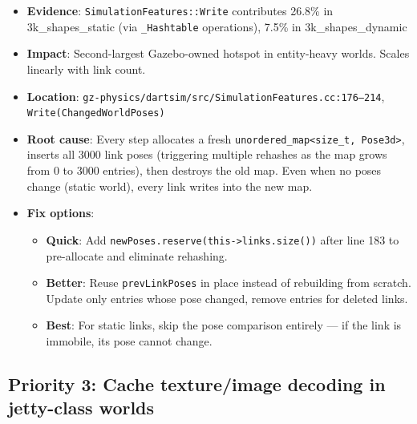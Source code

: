 \documentclass[11pt, a4paper]{article}
\providecommand{\tightlist}{%
  \setlength{\itemsep}{0pt}\setlength{\parskip}{0pt}}
\begin{document}
\begin{itemize}
\tightlist
\item
  \textbf{Evidence}: \texttt{SimulationFeatures::Write} contributes 26.8\% in 3k\_shapes\_static (via \texttt{\_Hashtable} operations), 7.5\% in 3k\_shapes\_dynamic
\item
  \textbf{Impact}: Second-largest Gazebo-owned hotspot in entity-heavy worlds. Scales linearly with link count.
\item
  \textbf{Location}: \texttt{gz-physics/dartsim/src/SimulationFeatures.cc:176--214}, \texttt{Write(ChangedWorldPoses)}
\item
  \textbf{Root cause}: Every step allocates a fresh \texttt{unordered\_map<size\_t, Pose3d>}, inserts all 3000 link poses (triggering multiple rehashes as the map grows from 0 to 3000 entries), then destroys the old map. Even when no poses change (static world), every link writes into the new map.
\item
  \textbf{Fix options}:
  \begin{itemize}
  \item \textbf{Quick}: Add \texttt{newPoses.reserve(this->links.size())} after line 183 to pre-allocate and eliminate rehashing.
  \item \textbf{Better}: Reuse \texttt{prevLinkPoses} in place instead of rebuilding from scratch. Update only entries whose pose changed, remove entries for deleted links.
  \item \textbf{Best}: For static links, skip the pose comparison entirely --- if the link is immobile, its pose cannot change.
  \end{itemize}
\end{itemize}

\subsection{Priority 3: Cache texture/image decoding in jetty-class
worlds}\label{priority-3-cache-textureimage-decoding-in-jetty-class-worlds}
\end{document}
